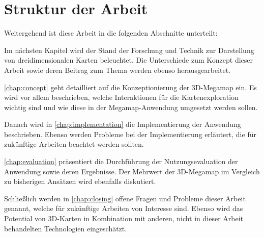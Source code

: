 \section{Struktur der Arbeit}
\label{sec:struktur}
Weitergehend ist diese Arbeit in die folgenden Abschnitte unterteilt:

Im nächsten Kapitel wird der Stand der Forschung und Technik zur Darstellung von dreidimensionalen Karten beleuchtet.
Die Unterschiede zum Konzept dieser Arbeit sowie deren Beitrag zum Thema werden ebenso herausgearbeitet.

\autoref{chap:concept} geht detailliert auf die Konzeptionierung der 3D-Megamap ein.
Es wird vor allem beschrieben, welche Interaktionen für die Kartenexploration wichtig sind und wie diese in der Megamap-Anwendung umgesetzt werden sollen.

Danach wird in \autoref{chap:implementation} die Implementierung der Anwendung beschrieben.
Ebenso werden Probleme bei der Implementierung erläutert, die für zukünftige Arbeiten beachtet werden sollten.

\autoref{chap:evaluation} präsentiert die Durchführung der Nutzungsevaluation der Anwendung sowie deren Ergebnisse.
Der Mehrwert der 3D-Megamap im Vergleich zu bisherigen Ansätzen wird ebenfalls diskutiert.

Schließlich werden in \autoref{chap:closing} offene Fragen und Probleme dieser Arbeit genannt, welche für zukünftige Arbeiten von Interesse sind.
Ebenso wird das Potential von 3D-Karten in Kombination mit anderen, nicht in dieser Arbeit behandelten Technologien eingeschätzt.
%
\cleardoublepage

